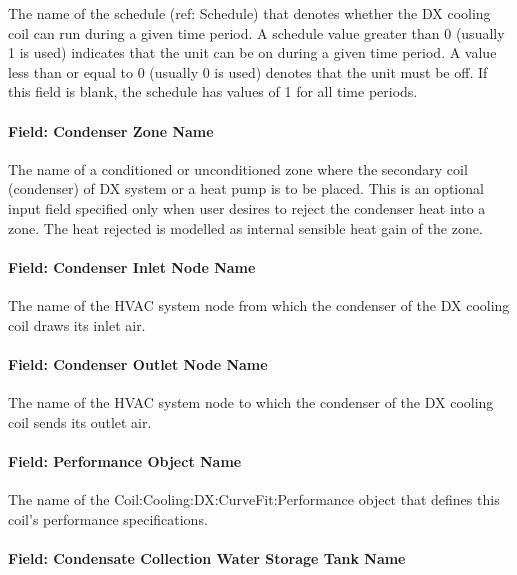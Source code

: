 The name of the schedule (ref: Schedule) that denotes whether the DX cooling coil can run during a given time period. A schedule value greater than 0 (usually 1 is used) indicates that the unit can be on during a given time period. A value less than or equal to 0 (usually 0 is used) denotes that the unit must be off. If this field is blank, the schedule has values of 1 for all time periods.

\paragraph{Field: Condenser Zone Name}\label{field-condenser-zone-name-6-001}

The name of a conditioned or unconditioned zone where the secondary coil (condenser) of DX system or a heat pump is to be placed.  This is an optional input field specified only when user desires to reject the condenser heat into a zone. The heat rejected is modelled as internal sensible heat gain of the zone.

\paragraph{Field: Condenser Inlet Node Name}\label{field-condenser-inlet-node-name-6-001}

The name of the HVAC system node from which the condenser of the DX cooling coil draws its inlet air.

\paragraph{Field: Condenser Outlet Node Name}\label{field-condenser-outlet-node-name-6-001}

The name of the HVAC system node to which the condenser of the DX cooling coil sends its outlet air.

\paragraph{Field: Performance Object Name}\label{field-performance-object-name-6-001}

The name of the Coil:Cooling:DX:CurveFit:Performance object that defines this coil's performance specifications.

\paragraph{Field: Condensate Collection Water Storage Tank Name}\label{field-condensate-collection-water-storage-tank-name-2}

